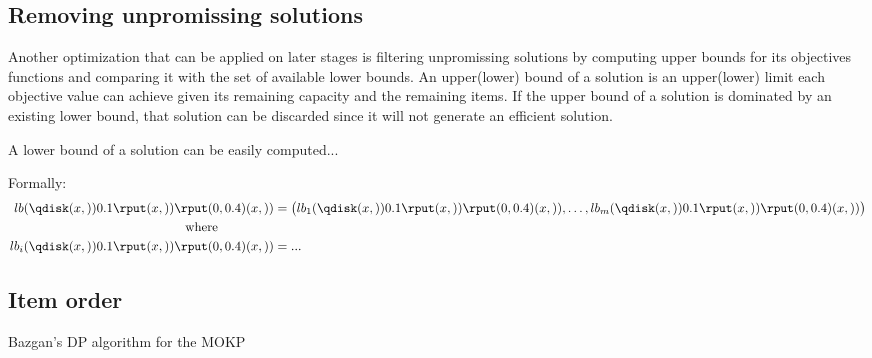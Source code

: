 \subsection{Removing unpromissing solutions}

Another optimization that can be applied on later stages is
filtering unpromissing solutions by computing upper bounds for its objectives
functions and comparing it with the set of available lower bounds.
An upper(lower) bound of a solution is an upper(lower) limit each objective
value can achieve given its remaining capacity and the remaining items.
If the upper bound of a solution is dominated by an existing lower bound,
that solution can be discarded since it will not generate an efficient solution.

A lower bound of a solution can be easily computed...

Formally:
\begin{displaymath}
\end{displaymath}
\begin{align*}
    lb(\sol{x}) &= \big(lb_1(\sol{x}),\ldots, lb_\np(\sol{x}) \big) \\
    \text{where} \phantom{mmmmm} \\
    lb_i(\sol{x}) &= ...
\end{align*}

\subsection{Item order}

\begin{algorithm}
  \caption{Bazgan's DP algorithm for the MOKP}
  \label{alg:bazgan}
  
\end{algorithm}



